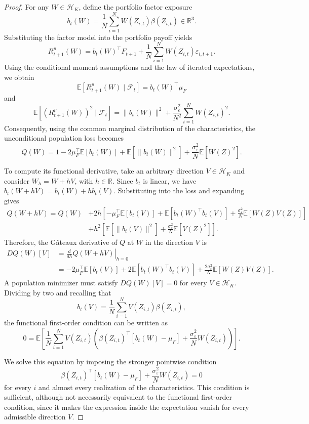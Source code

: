 \begin{proof}
For any $W\in\mathcal H_K$, define the portfolio factor exposure
\[
b_t(W)=\frac1N\sum_{i=1}^NW(Z_{i,t})\beta(Z_{i,t})\in\mathbb R^3.
\]
Substituting the factor model into the portfolio payoff yields
\[
R^p_{t+1}(W)=b_t(W)^\top F_{t+1}+\frac1N\sum_{i=1}^NW(Z_{i,t})\varepsilon_{i,t+1}.
\]
Using the conditional moment assumptions and the law of iterated expectations, we obtain
\[
\mathbb E[R^p_{t+1}(W)\mid\mathcal F_t]=b_t(W)^\top\mu_F
\]
and
\[
\mathbb E[(R^p_{t+1}(W))^2\mid\mathcal F_t]
=\|b_t(W)\|^2+\frac{\sigma_\varepsilon^2}{N^2}\sum_{i=1}^NW(Z_{i,t})^2.
\]
Consequently, using the common marginal distribution of the characteristics, the unconditional population loss becomes
\[
Q(W)=1-2\mu_F^\top\mathbb E[b_t(W)]+\mathbb E[\|b_t(W)\|^2]
+\frac{\sigma_\varepsilon^2}{N}\mathbb E[W(Z)^2].
\]

To compute its functional derivative, take an arbitrary direction $V\in\mathcal H_K$ and consider $W_h=W+hV$, with $h\in\mathbb R$. Since $b_t$ is linear, we have $b_t(W+hV)=b_t(W)+hb_t(V)$. Substituting into the loss and expanding gives
\[
\begin{aligned}
Q(W+hV)=Q(W)
&+2h\left[-\mu_F^\top\mathbb E[b_t(V)]
+\mathbb E[b_t(W)^\top b_t(V)]
+\frac{\sigma_\varepsilon^2}{N}\mathbb E[W(Z)V(Z)]\right]\\
&+h^2\left[\mathbb E[\|b_t(V)\|^2]
+\frac{\sigma_\varepsilon^2}{N}\mathbb E[V(Z)^2]\right].
\end{aligned}
\]
Therefore, the Gâteaux derivative of $Q$ at $W$ in the direction $V$ is
\[
\begin{aligned}
DQ(W)[V]
&=\left.\frac{d}{dh}Q(W+hV)\right|_{h=0}\\
&=-2\mu_F^\top\mathbb E[b_t(V)]
+2\mathbb E[b_t(W)^\top b_t(V)]
+\frac{2\sigma_\varepsilon^2}{N}\mathbb E[W(Z)V(Z)].
\end{aligned}
\]
A population minimizer must satisfy $DQ(W)[V]=0$ for every $V\in\mathcal H_K$. Dividing by two and recalling that
\[
b_t(V)=\frac1N\sum_{i=1}^NV(Z_{i,t})\beta(Z_{i,t}),
\]
the functional first-order condition can be written as
\[
0=\mathbb E\left[\frac1N\sum_{i=1}^NV(Z_{i,t})
\left(\beta(Z_{i,t})^\top[b_t(W)-\mu_F]
+\frac{\sigma_\varepsilon^2}{N}W(Z_{i,t})\right)\right].
\]

We solve this equation by imposing the stronger pointwise condition
\[
\beta(Z_{i,t})^\top[b_t(W)-\mu_F]
+\frac{\sigma_\varepsilon^2}{N}W(Z_{i,t})=0
\]
for every $i$ and almost every realization of the characteristics. This condition is sufficient, although not necessarily equivalent to the functional first-order condition, since it makes the expression inside the expectation vanish for every admissible direction $V$.


\end{proof}
